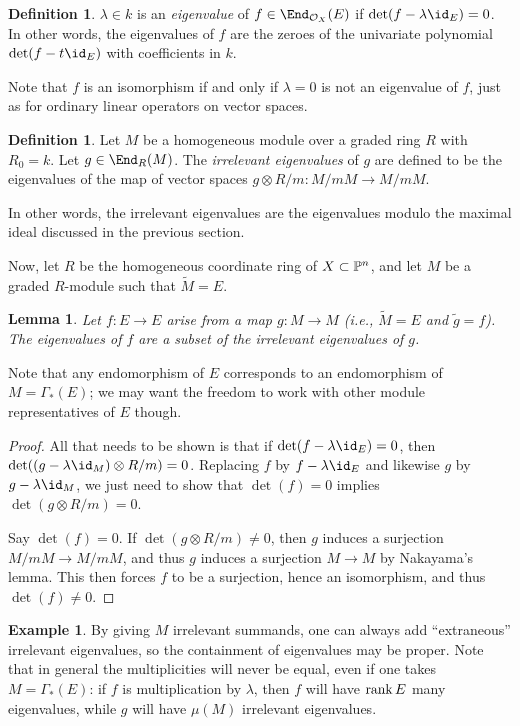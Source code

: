 \documentclass[12pt]{article}
\let\l\lambda
\let\wtilde\widetilde
\theoremstyle{theorem}
\numberwithin{thm}{section}
\newtheorem{lem}[thm]{Lemma}
\theoremstyle{definition}
\newtheorem{dfn}[thm]{Definition}
\newtheorem{exa}[thm]{Example}
\def\defn#1{{\it #1}}
\begin{document}
\begin{dfn}
$\l \in k$ is an \defn{eigenvalue} of $f \in \End_{\O_X}(E)$ if $\det(f-\l \id_E)= 0$. In other words, the eigenvalues of $f$ are the zeroes of the univariate polynomial $\det(f-t\id _E)$ with coefficients in $k$.
\end{dfn}

Note that $f$ is an isomorphism if and only if $\l=0$ is not an eigenvalue of $f$, just as for ordinary linear operators on vector spaces.

\begin{dfn}
Let $M$ be a homogeneous module over a graded ring $R$ with $R_0=k$.
Let $g \in \End_R(M)$. The \defn{irrelevant eigenvalues} of $g$ are defined to be the eigenvalues of the map of vector spaces $g\otimes R/m:M/mM \to M/mM$.
\end{dfn}

In other words, the irrelevant eigenvalues are the eigenvalues modulo the maximal ideal discussed in the previous section.


Now, let $R$ be the homogeneous coordinate ring of $X\subset \P^n$, and let $M$ be a graded $R$-module such that $\wtilde M=E$.

\begin{lem}
Let $f:E\to E$ arise from a map $g:M\to M$ (i.e., $\wtilde M = E$ and $\wtilde g = f$).
The eigenvalues of $f$ are a subset of the irrelevant eigenvalues of $g$.
\end{lem}

Note that any endomorphism of $E$ corresponds to an endomorphism of $M=\Gamma_*(E)$; we may want the freedom to work with other module representatives of $E$ though.

\begin{proof}
  All that needs to be shown is that if $\det(f-\l \id_E) =0$, then $\det((g-\l \id_M)\otimes R/m)=0$.
Replacing $f$ by $f-\l \id_E$ and likewise $g$ by $g-\l\id_M$, we just need to show that $\det(f)=0$ implies $\det(g\otimes R/m)=0$.

Say $\det(f)=0$.
If $\det(g\otimes R/m)\neq 0$, then $g$ induces a surjection $M/mM\to M/mM$, and thus $g$ induces a surjection $M\to M$ by Nakayama's lemma. This then forces $f$ to be a surjection, hence an isomorphism, and thus $\det(f)\neq 0$.
\end{proof}

\begin{exa}
By giving $M$ irrelevant summands, one can always add ``extraneous'' irrelevant eigenvalues, so the containment of eigenvalues may be proper.
Note that in general the multiplicities will never be equal, even if one takes $M=\Gamma_*(E)$: if $f$ is multiplication by $\l$, then $f$ will have $\rank E$ many eigenvalues, while $g$ will have $\mu(M)$ irrelevant eigenvalues.
\end{exa}
\end{document}

